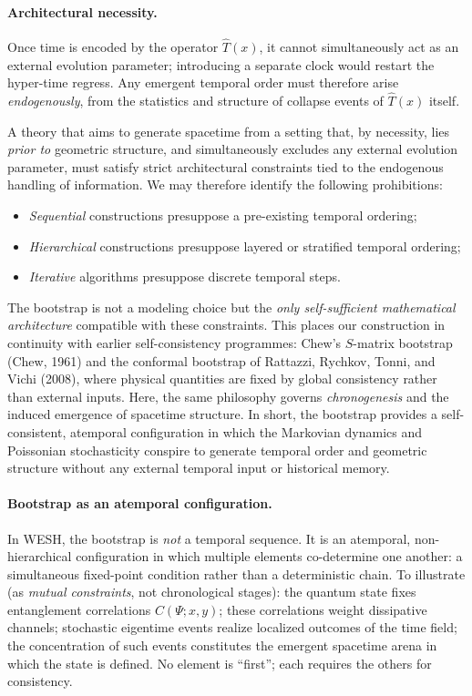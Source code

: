 \documentclass[12pt,a4paper]{article}
\numberwithin{equation}{section}
\begin{document}
\paragraph{Architectural necessity.}
Once time is encoded by the operator $\hat T(x)$, it cannot simultaneously act as an external evolution parameter; introducing a separate clock would restart the hyper-time regress. Any emergent temporal order must therefore arise \emph{endogenously}, from the statistics and structure of collapse events of $\hat T(x)$ itself. 

A theory that aims to generate spacetime from a setting that, by necessity, lies \emph{prior to} geometric structure, and simultaneously excludes any external evolution parameter, must satisfy strict architectural constraints tied to the endogenous handling of information. We may therefore identify the following prohibitions:
\begin{itemize}[leftmargin=1.5em,itemsep=0.1em]
\item \emph{Sequential} constructions presuppose a pre-existing temporal ordering;
\item \emph{Hierarchical} constructions presuppose layered or stratified temporal ordering;
\item \emph{Iterative} algorithms presuppose discrete temporal steps.
\end{itemize}
The bootstrap is not a modeling choice but the \emph{only self-sufficient mathematical architecture} compatible with these constraints. This places our construction in continuity with earlier self-consistency programmes: Chew’s $S$-matrix bootstrap (Chew, 1961) and the conformal bootstrap of Rattazzi, Rychkov, Tonni, and Vichi (2008), where physical quantities are fixed by global consistency rather than external inputs. Here, the same philosophy governs \emph{chronogenesis} and the induced emergence of spacetime structure. In short, the bootstrap provides a self-consistent, atemporal configuration in which the Markovian dynamics and Poissonian stochasticity conspire to generate temporal order and geometric structure without any external temporal input or historical memory.

\paragraph{Bootstrap as an atemporal configuration.}
In WESH, the bootstrap is \emph{not} a temporal sequence. It is an atemporal, non-hierarchical configuration in which multiple elements co-determine one another: a simultaneous fixed-point condition rather than a deterministic chain. To illustrate (as \emph{mutual constraints}, not chronological stages): the quantum state fixes entanglement correlations $C(\Psi;x,y)$; these correlations weight dissipative channels; stochastic eigentime events realize localized outcomes of the time field; the concentration of such events constitutes the emergent spacetime arena in which the state is defined. No element is ``first''; each requires the others for consistency.
\end{document}
